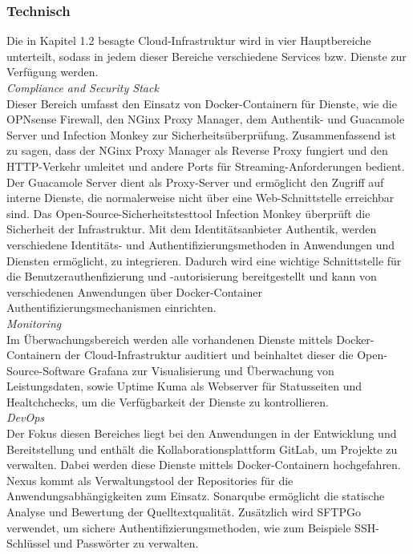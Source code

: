 \subsubsection{Technisch}
\label{sec:Technisch}
Die in Kapitel 1.2 besagte Cloud-Infrastruktur wird in vier  
Hauptbereiche unterteilt, sodass in jedem dieser Bereiche verschiedene Services bzw. 
Dienste zur Verfügung werden.
\\\textit{Compliance and Security Stack}
\\Dieser Bereich umfasst den Einsatz von Docker-Containern für Dienste, wie die OPNsense Firewall, 
den NGinx Proxy Manager, dem Authentik- und Guacamole Server und Infection Monkey zur Sicherheitsüberprüfung. 
Zusammenfassend ist zu sagen, dass der NGinx Proxy Manager als Reverse Proxy fungiert und den HTTP-Verkehr 
umleitet und andere Ports für Streaming-Anforderungen bedient. Der Guacamole Server dient als Proxy-Server 
und ermöglicht den Zugriff auf interne Dienste, die normalerweise nicht über eine Web-Schnittstelle erreichbar sind.
Das Open-Source-Sicherheitstesttool Infection Monkey überprüft die Sicherheit der Infrastruktur. 
Mit dem Identitätsanbieter Authentik, werden verschiedene Identitäts- und Authentifizierungsmethoden in 
Anwendungen und Diensten ermöglicht, zu integrieren. Dadurch wird eine wichtige Schnittstelle für die 
Benutzerauthenfizierung und -autorisierung bereitgestellt und kann von verschiedenen Anwendungen über 
Docker-Container Authentifizierungsmechanismen einrichten.
\\\textit{Monitoring}
\\Im Überwachungsbereich werden alle vorhandenen Dienste mittels Docker-Containern der Cloud-Infrastruktur auditiert 
und beinhaltet dieser die Open-Source-Software Grafana zur Visualisierung und Überwachung von Leistungsdaten, sowie 
Uptime Kuma als Webserver für Statusseiten und Healtchchecks, um die Verfügbarkeit der Dienste zu kontrollieren. 
\\\textit{DevOps}
\\Der Fokus diesen Bereiches liegt bei den Anwendungen in der Entwicklung und Bereitstellung und enthält die 
Kollaborationsplattform GitLab, um Projekte zu verwalten. Dabei werden diese Dienste mittels Docker-Containern hochgefahren. 
Nexus kommt als Verwaltungstool der Repositories für die Anwendungsabhängigkeiten zum Einsatz. Sonarqube ermöglicht die 
statische Analyse und Bewertung der Quelltextqualität. Zusätzlich wird SFTPGo verwendet, um sichere Authentifizierungsmethoden, 
wie zum Beispiele SSH-Schlüssel und Passwörter zu verwalten.
